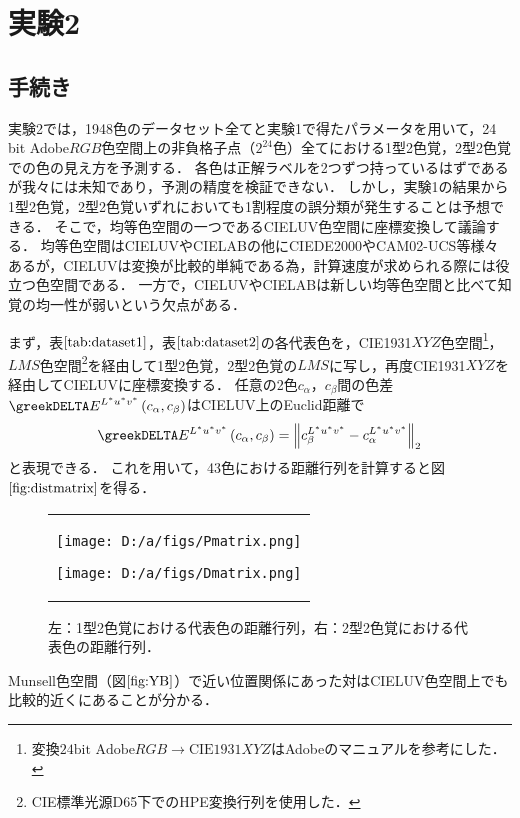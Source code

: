 \documentclass[uplatex,paper=a4,fontsize=4.0truemm,jafontsize=4.0truemm,head_space=30.0truemm,foot_space=30.0truemm,baselineskip=8.0truemm,line_length=40zw,gutter=25.0truemm,oneside,openany,fleqn,hanging_panctuation,open_bracket_pos=nibu_tentsuki,dvipdfmx,jis2004,book,titlepage]{jlreq}
\theoremstyle{mystyle}
\newcommand{\captiondot}[1]{\caption{#1．}}
\newcommand{\mathdisplaystyle}[1]{\(\displaystyle{#1}\)}
\newcommand{\Reference}[1]{\mathdisplaystyle{\ref{#1}}}
\newcommand{\parentheses}[1]{\left(#1\right)}
\newcommand{\norm}[2]{{\left\lVert#1\right\rVert}_{#2}}
\begin{document}
		\section{実験2}
			\subsection{手続き}
				実験2では，1948色のデータセット全てと実験1で得たパラメータを用いて，24 bit Adobe\mathdisplaystyle{RGB}色空間上の非負格子点（\mathdisplaystyle{2^{24}}色）全てにおける1型2色覚，2型2色覚での色の見え方を予測する．
				各色は正解ラベルを2つずつ持っているはずであるが我々には未知であり，予測の精度を検証できない．
				しかし，実験1の結果から1型2色覚，2型2色覚いずれにおいても1割程度の誤分類が発生することは予想できる．
				そこで，均等色空間の一つであるCIELUV色空間に座標変換して議論する．
				均等色空間はCIELUVやCIELABの他にCIEDE2000やCAM02-UCS等様々ある\cite{Yaguchi2017b}が，CIELUVは変換が比較的単純である為，計算速度が求められる際には役立つ色空間である．
				一方で，CIELUVやCIELABは新しい均等色空間と比べて知覚の均一性が弱いという欠点がある\cite[p.~10]{Robertson1977}．

				まず，表\Reference{tab:dataset1}，表\Reference{tab:dataset2}の各代表色を，CIE1931\mathdisplaystyle{XYZ}色空間\footnote{変換\mathdisplaystyle{\textrm{24bit Adobe}RGB\to\textrm{CIE1931}XYZ}はAdobe\textregistered のマニュアル\cite{Adobe2005}を参考にした．}，\mathdisplaystyle{LMS}色空間\footnote{CIE標準光源D65下でのHPE変換行列を使用した．}を経由して1型2色覚，2型2色覚の\mathdisplaystyle{LMS}に写し，再度CIE1931\mathdisplaystyle{XYZ}を経由してCIELUVに座標変換する．
				任意の2色\mathdisplaystyle{c_\alpha}，\mathdisplaystyle{c_\beta}間の色差\mathdisplaystyle{\greekDELTA E^{L^\ast u^\ast v^\ast}\parentheses{c_\alpha,c_\beta}}はCIELUV上のEuclid距離で
				\begin{equation*}
					\greekDELTA E^{L^\ast u^\ast v^\ast}\parentheses{c_\alpha,c_\beta}=\norm{c_\beta^{L^\ast u^\ast v^\ast}-c_\alpha^{L^\ast u^\ast v^\ast}}{2}
				\end{equation*}
				と表現できる．
				これを用いて，43色における距離行列を計算すると図\Reference{fig:distmatrix}を得る．
				\begin{figure}[tbp]
					\centering
					\begin{tabular}{c}
						\begin{minipage}{0.5\linewidth}
							\centering
							\texttt{[image: D:/a/figs/Pmatrix.png]}
						\end{minipage}
						\begin{minipage}{0.5\linewidth}
							\centering
							\texttt{[image: D:/a/figs/Dmatrix.png]}
						\end{minipage}
					\end{tabular}
					\captiondot{左：1型2色覚における代表色の距離行列，右：2型2色覚における代表色の距離行列}\label{fig:distmatrix}
				\end{figure}
				Munsell色空間（図\Reference{fig:YB}）で近い位置関係にあった対はCIELUV色空間上でも比較的近くにあることが分かる．
\end{document}
